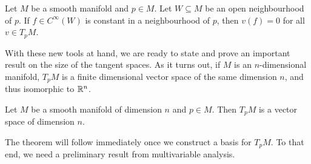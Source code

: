 \begin{corollary}\label{cor:derzero}
  Let $M$ be a smooth manifold and $p\in M$.
  Let $W\subseteq M$ be an open neighbourhood of $p$.
  If $f\in C^\infty(W)$ is constant in a neighbourhood of $p$, then $v(f) = 0$ for all $v\in T_p M$.
\end{corollary}

With these new tools at hand, we are ready to state and prove an important result on the size of the tangent spaces.
As it turns out, if $M$ is an $n$-dimensional manifold, $T_pM$ is a finite dimensional vector space of the same dimension $n$, and thus isomorphic to $\mathbb{R}^n$.

\begin{theorem}\label{thm:dimensionTpM}
  Let $M$ be a smooth manifold of dimension $n$ and $p\in M$.
  Then $T_pM$ is a vector space of dimension $n$.
\end{theorem}

The theorem will follow immediately once we construct a basis for $T_pM$.
To that end, we need a preliminary result from multivariable analysis.


